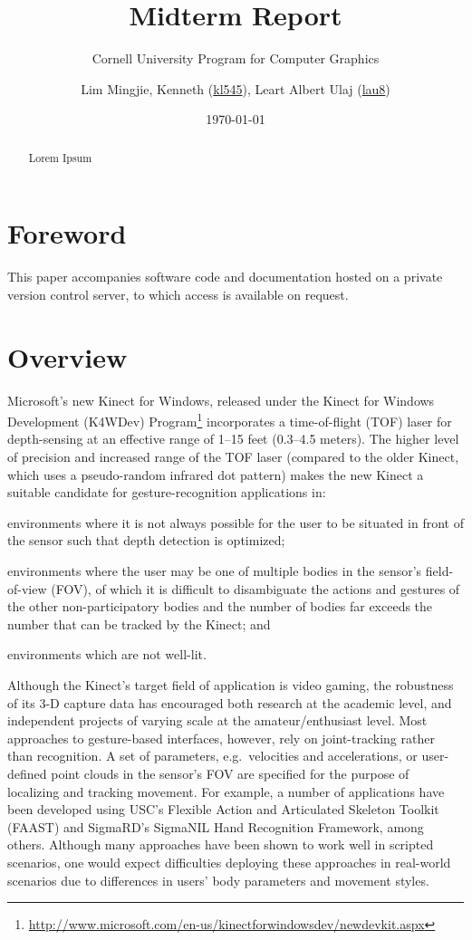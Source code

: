 \documentclass{scrartcl}
\title{Midterm Report}
\subtitle{Cornell University Program for Computer Graphics}
\author{Lim Mingjie, Kenneth (\href{mailto:kl545@cornell.edu}{kl545}), Leart Albert Ulaj (\href{mailto:lau8@cornell.edu}{lau8})}
\date{\today}
\begin{document}
  \maketitle
  \begin{abstract}
    Lorem Ipsum
  \end{abstract}
  \tableofcontents
  \newpage
  \section{Foreword}
    This paper accompanies software code and documentation hosted on a private version control server, to which access is available on request.
  \section{Overview}
    Microsoft's new Kinect for Windows, released under the Kinect for Windows Development (K4WDev) Program\footnote{\url{http://www.microsoft.com/en-us/kinectforwindowsdev/newdevkit.aspx}} incorporates a time-of-flight (TOF) laser for depth-sensing at an effective range of 1--15 feet (0.3--4.5 meters). The higher level of precision and increased range of the TOF laser (compared to the older Kinect, which uses a pseudo-random infrared dot pattern) makes the new Kinect a suitable candidate for gesture-recognition applications in:\begin{inparaenum}[(1)]
      \item environments where it is not always possible for the user to be situated in front of the sensor such that depth detection is optimized;
      \item environments where the user may be one of multiple bodies in the sensor's field-of-view (FOV), of which it is difficult to disambiguate the actions and gestures of the other non-participatory bodies and the number of bodies far exceeds the number that can be tracked by the Kinect; and
      \item environments which are not well-lit.
    \end{inparaenum}

    Although the Kinect's target field of application is video gaming, the robustness of its 3-D capture data has encouraged both research at the academic level, and independent projects of varying scale at the amateur/enthusiast level. Most approaches to gesture-based interfaces, however, rely on joint-tracking rather than recognition. A set of parameters, e.g.~velocities and accelerations, or user-defined point clouds in the sensor's FOV are specified for the purpose of localizing and tracking movement. For example, a number of applications have been developed using USC's Flexible Action and Articulated Skeleton Toolkit (FAAST) and SigmaRD's SigmaNIL Hand Recognition Framework, among others. Although many approaches have been shown to work well in scripted scenarios, one would expect difficulties deploying these approaches in real-world scenarios due to differences in users' body parameters and movement styles.
\end{document}
